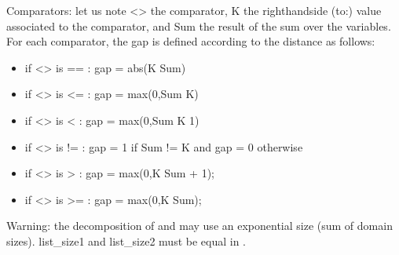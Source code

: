 \documentclass[letterpaper,10pt,openany,oneside,english]{sphinxmanual}
\begin{document}
\begin{itemize}
\begin{itemize}
\begin{sphinxVerbatim}[commandchars=\\\{\}]
  \PYG{p}{[}   \PYG{p}{]}
           
          
             
             
             
\end{sphinxVerbatim}

\end{itemize}

\sphinxAtStartPar
Comparators: let us note \textless{}\textgreater{} the comparator, K the right\sphinxhyphen{}hand\sphinxhyphen{}side (to:) value associated to the comparator, and Sum the result of the sum over the variables. For each comparator, the gap is defined according to the distance as follows:
\begin{itemize}
\item {} 
\sphinxAtStartPar
if \textless{}\textgreater{} is == : gap = abs(K \sphinxhyphen{} Sum)

\item {} 
\sphinxAtStartPar
if \textless{}\textgreater{} is \textless{}= : gap = max(0,Sum \sphinxhyphen{} K)

\item {} 
\sphinxAtStartPar
if \textless{}\textgreater{} is \textless{} : gap = max(0,Sum \sphinxhyphen{} K \sphinxhyphen{} 1)

\item {} 
\sphinxAtStartPar
if \textless{}\textgreater{} is != : gap = 1 if Sum != K and gap = 0 otherwise

\item {} 
\sphinxAtStartPar
if \textless{}\textgreater{} is \textgreater{} : gap = max(0,K \sphinxhyphen{} Sum + 1);

\item {} 
\sphinxAtStartPar
if \textless{}\textgreater{} is \textgreater{}= : gap = max(0,K \sphinxhyphen{} Sum);

\end{itemize}

\end{itemize}

\sphinxAtStartPar
Warning: the decomposition of  and  may use an exponential size (sum of domain sizes). list\_size1 and list\_size2 must be equal in .



\renewcommand{\indexname}{Index}
\printindex
\end{document}

